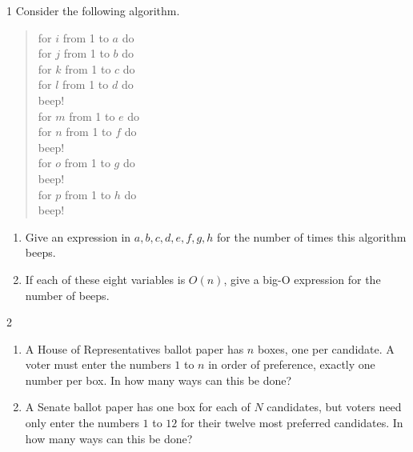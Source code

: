 
\begin{exercise}{1}
    Consider the following algorithm.
    \begin{quote}
        for $i$ from 1 to $a$ do\\
        \hspace*{1em} for $j$ from 1 to $b$ do\\
        \hspace*{2em} for $k$ from 1 to $c$ do\\
        \hspace*{3em} for $l$ from 1 to $d$ do\\
        \hspace*{4em} beep!\\
        \hspace*{1em} for $m$ from 1 to $e$ do\\
        \hspace*{2em} for $n$ from 1 to $f$ do\\
        \hspace*{3em} beep!\\
        \hspace*{2em} for $o$ from 1 to $g$ do\\
        \hspace*{3em} beep!\\
        \hspace*{2em} for $p$ from 1 to $h$ do\\
        \hspace*{3em} beep!
    \end{quote}
    \begin{enumerate}[label=(\alph*)]
        \item Give an expression in $a,b,c,d,e,f,g,h$ for the number of times
              this algorithm beeps.
        \item If each of these eight variables is $O(n)$, give a big-O expression
              for the number of beeps.
    \end{enumerate}
\end{exercise}

\begin{exercise}{2}
    \begin{enumerate}[label=(\alph*)]
        \item A House of Representatives ballot paper has $n$ boxes, one per
              candidate. A voter must enter the numbers $1$ to $n$ in order of
              preference, exactly one number per box. In how many ways can this
              be done?
        \item A Senate ballot paper has one box for each of $N$ candidates, but
              voters need only enter the numbers $1$ to $12$ for their twelve most
              preferred candidates. In how many ways can this be done?
    \end{enumerate}
\end{exercise}

